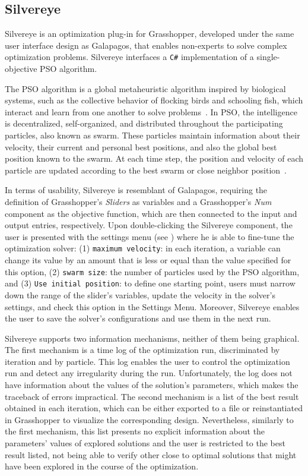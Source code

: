 \subsection{Silvereye}
Silvereye is an optimization plug-in for Grasshopper, developed under the same user interface design as Galapagos, that enables non-experts to solve complex optimization problems. Silvereye interfaces a \texttt{C\#} implementation of a single-objective \ac{PSO} algorithm.

The \ac{PSO} algorithm is a global metaheuristic algorithm inspired by biological systems, such as the collective behavior of flocking birds and schooling fish, which interact and learn from one another to solve problems~\cite{Brownlee2011}. In \ac{PSO}, the intelligence is decentralized, self-organized, and distributed throughout the participating particles, also known as swarm. These particles maintain information about their velocity, their current and personal best positions, and also the global best position known to the swarm. At each time step, the position and velocity of each particle are updated according to the best swarm or close neighbor position~\cite{Brownlee2011}.

In terms of usability, Silvereye is resemblant of Galapagos, requiring the definition of Grasshopper's \textit{Sliders} as variables and a Grasshopper's \textit{Num} component as the objective function, which are then connected to the input and output entries, respectively. Upon double-clicking the Silvereye component, the user is presented with the settings menu (see ) where he is able to fine-tune the optimization solver: (1) \texttt{maximum velocity}: in each iteration, a variable can change its value by an amount that is less or equal than the value specified for this option, (2) \texttt{swarm size}: the number of particles used by the \ac{PSO} algorithm, and (3) \texttt{Use initial position}: to define one starting point, users must narrow down the range of the slider's variables, update the velocity in the solver's settings, and check this option in the Settings Menu. Moreover, Silvereye enables the user to save the solver's configurations and use them in the next run.

Silvereye supports two information mechanisms, neither of them being graphical. The first mechanism is a time log of the optimization run, discriminated by iteration and by particle. This log enables the user to control the optimization run and detect any irregularity during the run. Unfortunately, the log does not have information about the values of the solution's parameters, which makes the traceback of errors impractical. The second mechanism is a list of the best result obtained in each iteration, which can be either exported to a file or reinstantiated in Grasshopper to visualize the corresponding design. Nevertheless, similarly to the first mechanism, this list presents no explicit information about the parameters' values of explored solutions and the user is restricted to the best result listed, not being able to verify other close to optimal solutions that might have been explored in the course of the optimization.

